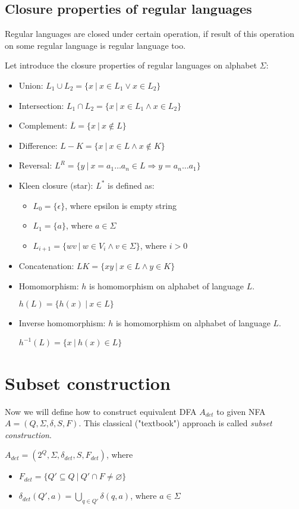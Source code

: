 		\subsection{Closure properties of regular languages}
		\label{defClose}
		Regular languages are closed under certain operation, if result of this operation on some regular language is regular language too.

		Let introduce the closure properties of regular languages on alphabet $\Sigma$:
		\begin{itemize}
			\item Union:  $L_1 \cup L_2=\{x\ |\ x \in L_1 \vee x\in L_2\}$
			\item Intersection:  $L_1 \cap L_2=\{x\ |\ x \in L_1 \wedge x\in L_2\}$
			\item Complement: $\overline{L}=\{x\ |\ x\not\in L\}$
			\item Difference: $L-K=\{x\ |\ x\in L \wedge x\not\in K\}$
			\item Reversal: $L^R = \{y\ |\ x=a_1\dots a_n \in L \Rightarrow y=a_n\dots a_1\}$
			\item Kleen closure (star): $L^{*}$ is defined as:
			\begin{itemize}
				\item $L_0=\{\epsilon\}$, where epsilon is empty string
				\item $L_1=\{a\}$, where $a\in \Sigma$
				\item $L_{i+1}=\{wv\ |\ w\in V_i \wedge v \in \Sigma\}$, where $i>0$
			\end{itemize}
			\item Concatenation: $LK=\{xy\ |\ x\in L \wedge y\in K\}$
			\item Homomorphism: $h$ is homomorphism on alphabet of language $L$.

$h(L)=\{h(x)\ |\ x \in L\}$
			\item Inverse homomorphism: $h$ is homomorphism on alphabet of language $L$.

$h^{-1}(L)=\{x\ |\ h(x) \in L\}$
		\end{itemize}

	\section{Subset construction}
	\label{subset}
	Now we will define how to construct equivalent DFA $A_{det}$ to given NFA $A=(Q,\Sigma,\delta,S,F)$. 
	This classical ("textbook") approach is called \emph{subset construction}.
	\begin{definition}
	\label{defSubset}
		$A_{det}=(2^Q,\Sigma,\delta_{det},S,F_{det})$, where
		\begin{itemize}
			\item $F_{det}=\{Q'\subseteq Q\ |\ Q'\cap F \not = \varnothing\}$
			\item $\delta_{det}(Q',a)=\bigcup\limits_{q\in Q'}\delta(q,a)$, where $a\in\Sigma$
		\end{itemize}
	\end{definition}
	
